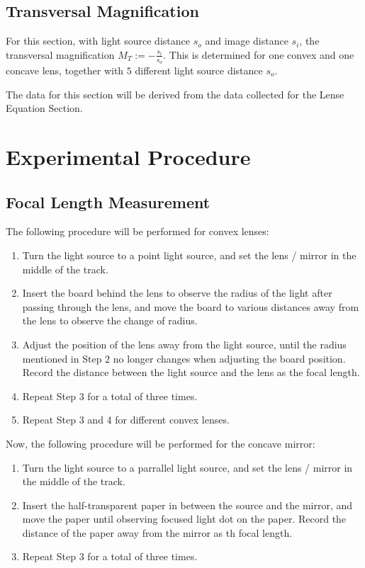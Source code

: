 \documentclass{article}
\begin{document}
\hfil

\subsection{Transversal Magnification}
For this section, with light source distance $s_o$ and image distance $s_i$, the transversal magnification $M_T := -\frac{s_i}{s_o}$. This is determined for one convex and one concave lens, together with $5$ different light source distance $s_o$.

The data for this section will be derived from the data collected for the Lense Equation Section.

\hfil

\hfil

\section{Experimental Procedure}
\subsection{Focal Length Measurement}
The following procedure will be performed for convex lenses:
\begin{enumerate}
    \item Turn the light source to a point light source, and set the lens / mirror in the middle of the track.
    \item Insert the board behind the lens to observe the radius of the light after passing through the lens, and move the board to various distances away from the lens to observe the change of radius.
    \item Adjust the position of the lens away from the light source, until the radius mentioned in Step 2 no longer changes when adjusting the board position. Record the distance between the light source and the lens as the focal length.
    \item Repeat Step 3 for a total of three times.
    \item Repeat Step 3 and 4 for different convex lenses.

\end{enumerate}

\hfil

Now, the following procedure will be performed for the concave mirror:
\begin{enumerate}
    \item Turn the light source to a parrallel light source, and set the lens / mirror in the middle of the track.
    \item Insert the half-transparent paper in between the source and the mirror, and move the paper until observing focused light dot on the paper. Record the distance of the paper away from the mirror as th focal length.
    \item Repeat Step 3 for a total of three times.
\end{enumerate}
\end{document}
